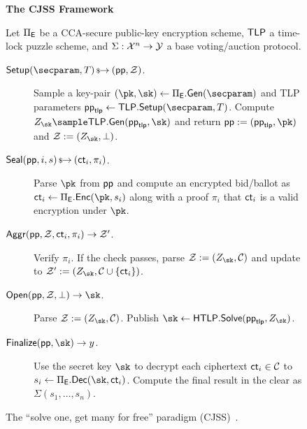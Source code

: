 \begin{figure}[ht]
\begin{mdframed}
\begin{center}
    \textbf{The CJSS Framework}
\end{center}
Let $\Pi_{\sf E}$ be a CCA-secure public-key encryption scheme, $\mathsf{TLP}$ a time-lock puzzle scheme, and $\Sigma: \mathcal{X}^n \rightarrow \mathcal{Y}$ a base voting/auction protocol.
\begin{description}
    \item[$\Setup(\secparam, \timeT) \randout (\pparam, \Z)$.] Sample a key-pair $(\pk, \sk) \gets \Pi_{\sf E}.{\sf Gen}(\secparam)$ and TLP parameters $\pparam_{\sf tlp} \gets \tlp.\Setup(\secparam, \timeT)$. Compute $Z_{\sk} \sample \tlp.\mathsf{Gen}(\pparam_{\sf tlp},\sk)$ and return $\pparam := (\pparam_{\sf tlp}, \pk)$ and $\Z := (Z_{\sk}, \perp)$.
    \item[$\mathsf{Seal}(\mathsf{pp}, i, s) \,{\mbox{\scriptsize${\$}$\normalsize}\!\!\to}\hskip2.3pt (\mathsf{ct}_i, \pi_{i})$.] Parse $\pk$ from $\mathsf{pp}$ and compute an encrypted bid/ballot as $\ct_i \gets \Pi_{\sf E}.\enc(\pk,s_i)$ along with a proof $\pi_{i}$ that $\mathsf{ct}_i$ is a valid encryption under $\pk$.
    \item[$\mathsf{Aggr}(\mathsf{pp}, \mathcal{Z}, \mathsf{ct}_{i}, \pi_{i}) \rightarrow \mathcal{Z}'$.] Verify $\pi_{i}$. If the check passes, parse $\Z := (Z_{\sk}, \mathcal{C})$ and update to $\Z' := (Z_{\sk}, \mathcal{C} \cup \{ \ct_{i} \})$.
    \item[$\Open(\pparam,\Z,\perp) \rightarrow \sk$.] Parse $\Z := (Z_{\sk}, \mathcal{C})$. Publish $\sk \leftarrow \htlp.\mathsf{Solve}(\pparam_{\sf tlp},\allowbreak Z_{\sk})$.
    \item[$\Finalize(\pparam,\sk) \rightarrow y$.] Use the secret key $\sk$ to decrypt each ciphertext $\mathsf{ct}_i \in \mathcal{C}$ to $s_i \gets \Pi_{\sf E}.\dec(\sk, \ct_i)$. Compute the final result in the clear as $\Sigma(s_1, \dots, s_n)$.
\end{description}
\end{mdframed}
\caption{The ``solve one, get many for free'' paradigm (CJSS)~\cite{ESORICS:CJSS21}.}
\label{fig:solve_one_protocol}
\end{figure}
